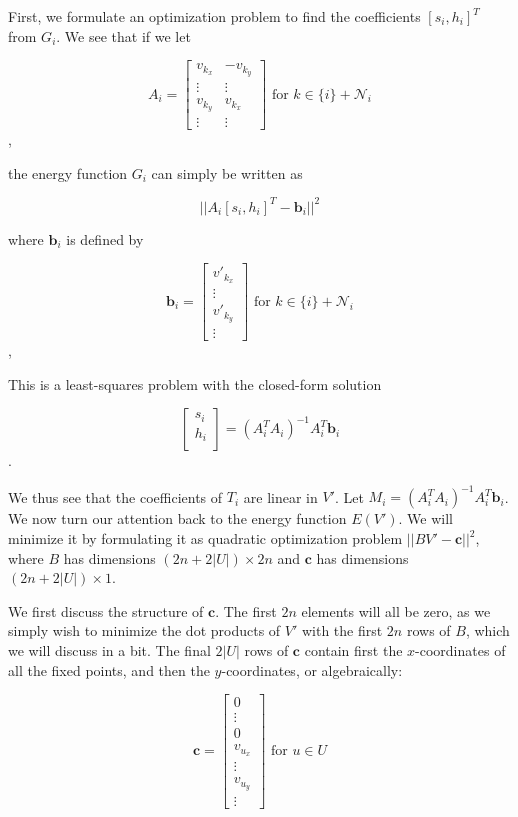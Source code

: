 \documentclass[english]{article}
\begin{document}
First, we formulate an optimization problem to find the coefficients $[s_i, h_i]^T$ from $G_i$. We see that if we let

\[
A_i = \begin{bmatrix}
  v_{k_x} & -v_{k_y} \\
  \vdots &  \vdots \\
  v_{k_y} &  v_{k_x} \\
  \vdots &  \vdots
\end{bmatrix}
\text{ for } k \in \{i\} + \mathcal{N}_i
\],

the energy function $G_i$ can simply be written as

\[
||A_i[s_i, h_i]^T - \mathbf{b}_i||^2
\]

where $\mathbf{b}_i$ is defined by

\[
\mathbf{b}_i = \begin{bmatrix}
  v'_{k_x} \\
  \vdots \\
  v'_{k_y} \\
  \vdots
\end{bmatrix}
\text{ for } k \in \{i\} + \mathcal{N}_i
\],

This is a least-squares problem with the closed-form solution

\[
\begin{bmatrix}
  s_i \\
  h_i \\
\end{bmatrix}
= (A_i^TA_i)^{-1}A_i^T\mathbf{b}_i
\].

We thus see that the coefficients of $T_i$ are linear in $V'$. Let $M_i = (A_i^TA_i)^{-1}A_i^T\mathbf{b}_i$. We now turn our attention back to the energy function $E(V')$. We will minimize it by formulating it as quadratic optimization problem $||BV' - \mathbf{c}||^2$, where $B$ has dimensions $(2n + 2|U|) \times 2n$ and $\mathbf{c}$ has dimensions $(2n + 2|U|) \times 1$.

We first discuss the structure of $\mathbf{c}$. The first $2n$ elements will all be zero, as we simply wish to minimize the dot products of $V'$ with the first $2n$ rows of $B$, which we will discuss in a bit. The final $2|U|$ rows of $\mathbf{c}$ contain first the $x$-coordinates of all the fixed points, and then the $y$-coordinates, or algebraically:

\[
\mathbf{c} = 
\begin{bmatrix}
  0 \\
  \vdots \\
  0 \\
  v_{u_x} \\
  \vdots \\
  v_{u_y} \\
  \vdots
\end{bmatrix}
\text{ for } u \in U
\]
\end{document}
